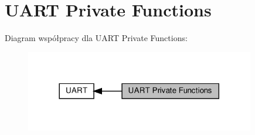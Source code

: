 \hypertarget{group___u_a_r_t___private___functions}{}\section{U\+A\+RT Private Functions}
\label{group___u_a_r_t___private___functions}
Diagram współpracy dla U\+A\+RT Private Functions\+:\nopagebreak
\begin{figure}[H]
\begin{center}
\leavevmode
\includegraphics[width=284pt]{group___u_a_r_t___private___functions}
\end{center}
\end{figure}
